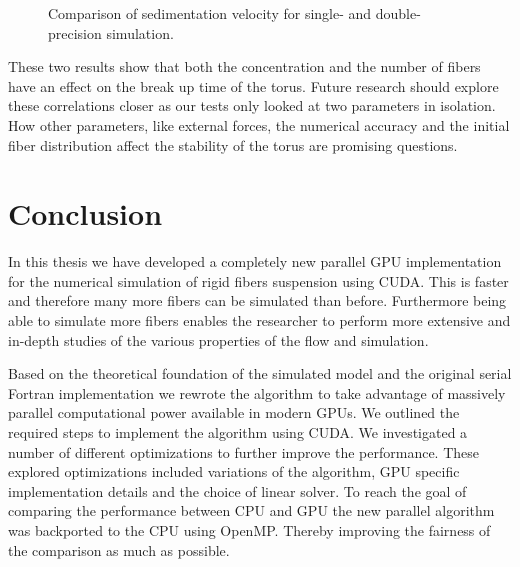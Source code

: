 \documentclass[a4paper,11pt]{kth-mag}
\begin{document}
\begin{figure}[!htbp]
  \centering
  \caption{Comparison of sedimentation velocity for single- and double-precision simulation.}
  \label{fig:number_breakup}
\end{figure}

These two results show that both the concentration and the number of fibers have an effect on the break up time of the torus. Future research should explore these correlations closer as our tests only looked at two parameters in isolation. How other parameters, like external forces, the numerical accuracy and the initial fiber distribution affect the stability of the torus are promising questions.

\chapter{Conclusion}

In this thesis we have developed a completely new parallel GPU implementation for the numerical simulation of rigid fibers suspension using CUDA. This is faster and therefore many more fibers can be simulated than before. Furthermore being able to simulate more fibers enables the researcher to perform more extensive and in-depth studies of the various properties of the flow and simulation.

Based on the theoretical foundation of the simulated model and the original serial Fortran implementation we rewrote the algorithm to take advantage of massively parallel computational power available in modern GPUs. We outlined the required steps to implement the algorithm using CUDA. We investigated a number of different optimizations to further improve the performance. These explored optimizations included variations of the algorithm, GPU specific implementation details and the choice of linear solver. To reach the goal of comparing the performance between CPU and GPU the new parallel algorithm was backported to the CPU using OpenMP. Thereby improving the fairness of the comparison as much as possible.
\end{document}
